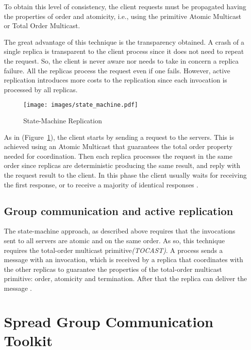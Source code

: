 To obtain this level of consistency, the client requests must be propagated having the properties of order and atomicity, i.e., using the primitive Atomic Multicast or Total Order Multicast.

The great advantage of this technique is the transparency obtained. A crash of a single replica is transparent to the client process since it does not need to repeat the request. So, the client is never aware nor needs to take in concern a replica failure. All the replicas process the request even if one fails. However, active replication introduces more costs to the replication since each invocation is processed by all replicas.


\begin{figure}[t]
\centering    
\texttt{[image: images/state\_machine.pdf]}
\caption{State-Machine Replication}
\label{fig:state_machine_repl}
\end{figure}

As in (Figure~\ref{fig:state_machine_repl}), the client starts by sending a request to the servers. This is achieved using an Atomic Multicast that guarantees the total order property needed for coordination. Then each replica processes the request in the same order since replicas are deterministic producing the same result, and reply with the request result to the client. In this phase the client usually waits for receiving the first response, or to receive a majority of identical responses \cite{Guerraoui96fault-toleranceby}.



\subsection{Group communication and active replication}

The state-machine approach, as described above requires that the invocations sent to all servers are atomic and on the same order. As so, this technique requires the total-order multicast primitive\textit{(TOCAST)}. 
A process sends a message with an invocation, which is received by a replica that coordinates with the other replicas to guarantee the properties of the total-order multicast primitive: order, atomicity and termination. After that the replica can deliver the message \cite{Guerraoui:1997p555}.



\section{Spread Group Communication Toolkit}

